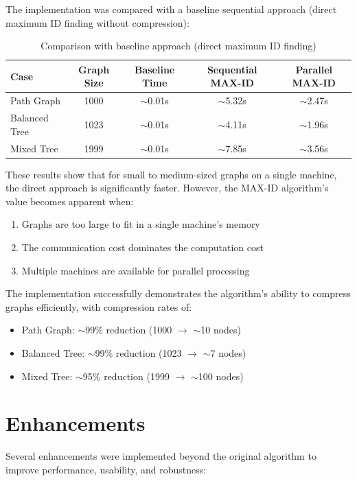 \documentclass[11pt,a4paper]{article}
\begin{document}
The implementation was compared with a baseline sequential approach (direct maximum ID finding without compression):

\begin{table}[h]
\centering
\begin{tabular}{@{}lcccc@{}}
\toprule
\textbf{Case} & \textbf{Graph Size} & \textbf{Baseline Time} & \textbf{Sequential MAX-ID} & \textbf{Parallel MAX-ID} \\
\midrule
Path Graph & 1000 & $\sim$0.01s & $\sim$5.32s & $\sim$2.47s \\
Balanced Tree & 1023 & $\sim$0.01s & $\sim$4.11s & $\sim$1.96s \\
Mixed Tree & 1999 & $\sim$0.01s & $\sim$7.85s & $\sim$3.56s \\
\bottomrule
\end{tabular}
\caption{Comparison with baseline approach (direct maximum ID finding)}
\label{tab:baseline_comparison}
\end{table}

These results show that for small to medium-sized graphs on a single machine, the direct approach is significantly faster. However, the MAX-ID algorithm's value becomes apparent when:
\begin{enumerate}
    \item Graphs are too large to fit in a single machine's memory
    \item The communication cost dominates the computation cost
    \item Multiple machines are available for parallel processing
\end{enumerate}

The implementation successfully demonstrates the algorithm's ability to compress graphs efficiently, with compression rates of:
\begin{itemize}
    \item Path Graph: $\sim$99\% reduction (1000 $\rightarrow$ $\sim$10 nodes)
    \item Balanced Tree: $\sim$99\% reduction (1023 $\rightarrow$ $\sim$7 nodes)
    \item Mixed Tree: $\sim$95\% reduction (1999 $\rightarrow$ $\sim$100 nodes)
\end{itemize}

\section{Enhancements}

Several enhancements were implemented beyond the original algorithm to improve performance, usability, and robustness:
\end{document}
